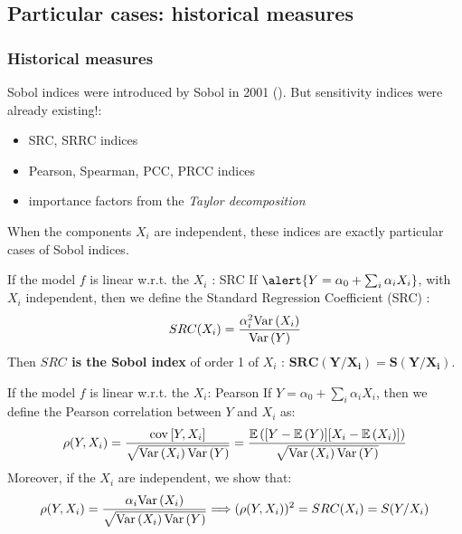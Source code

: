 \documentclass[8pt]{beamer}
\begin{document}
\subsection{Particular cases: historical measures}

\begin{frame}
\frametitle{Historical measures}
 \small
 
 Sobol indices  were introduced by Sobol in 2001 (\cite{Sobol2001}). But sensitivity indices were already existing!:
 \begin{itemize}
  \item SRC, SRRC indices
  \item Pearson, Spearman, PCC, PRCC indices
  \item importance factors from the \emph{Taylor decomposition}
 \end{itemize}
\alert{When the components $X_i$ are independent, these indices are exactly particular cases of Sobol indices.}

 \begin{block}{If the model $f$ is linear  w.r.t. the  $X_i$ : SRC}
  If $\alert{Y = \alpha_0 + \sum_i \alpha_i X_i}$, with \alert{ $X_i$ independent}, then we define the  \alert{ Standard Regression Coefficient (SRC)} :
    \begin{equation}
      SRC(X_i) = \displaystyle \frac{\alpha_i^2 \mbox{Var}\left( X_i \right)}{\mbox{Var}\left( Y \right)}
    \end{equation}
    Then {\bf $SRC $ is the Sobol index} of order 1 of $X_i$ : $\boldsymbol{    SRC (Y / X_i) = S(Y / X_i)}$.
 \end{block}

 
\begin{block}{If the model $f$ is linear  w.r.t. the  $X_i$: Pearson}
 If  \alert{$Y=\alpha_0 + \sum_i \alpha_i X_i$}, then we define the \alert{ Pearson correlation} between $Y$ and $X_i$ as:
   \begin{equation}
    \rho(Y,X_i) =  \dfrac{{\rm cov}\left[Y,X_i \right]}{\sqrt{\mbox{Var}\left( X_i \right)\mbox{Var}\left( Y \right)}} = \dfrac{\mathbb{E}\left( [Y-\mathbb{E}\left( Y \right)][X_i - \mathbb{E}\left( X_i \right)] \right)}{\sqrt{\mbox{Var}\left( X_i \right)\mbox{Var}\left( Y \right)}}
  \end{equation}
Moreover, if the  \alert{ $X_i$ are independent}, we show that:
  $$
  \rho(Y,X_i) = \dfrac{\alpha_i \mbox{Var}\left( X_i \right)}{\sqrt{\mbox{Var}\left( X_i \right)\mbox{Var}\left( Y \right)}} \Longrightarrow (\rho(Y,X_i))^2 = SRC(X_i) = S(Y/X_i)
  $$
  \end{block}
\end{frame}
 
\end{document}
